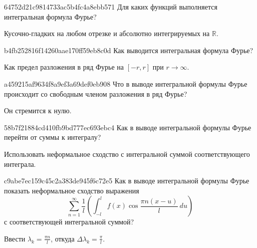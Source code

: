 \begin{note}{64752d21c9814733ac5b4fc4a8ebb571}
    Для каких функций выполняется интегральная формула Фурье?

    \begin{cloze}{1}
        Кусочно-гладких на любом отрезке и абсолютно интегрируемых на \({ \mathbb R }\).
    \end{cloze}
\end{note}

\begin{note}{b4fb252816f14260aae170ff59eb8c0d}
    Как выводится интегральная формула Фурье?

    \begin{cloze}{1}
        Как предел разложения в ряд Фурье на \({ [-r, r] }\) при \({ r \to \infty }\).
    \end{cloze}
\end{note}

\begin{note}{a459215af9634f8a9ef3a69def0eb908}
    Что в выводе интегральной формулы Фурье происходит со свободным членом разложения в ряд Фурье?

    \begin{cloze}{1}
        Он стремится к нулю.
    \end{cloze}
\end{note}

\begin{note}{58b7f21884cd410fb9bd777ec693ebc4}
    Как в выводе интегральной формулы Фурье перейти от суммы к интегралу?

    \begin{cloze}{1}
        Использовать неформальное сходство с интегральной суммой соответствующего интеграла.
    \end{cloze}
\end{note}

\begin{note}{c9abe7ec159c45c2a383de945f6c72e5}
    Как в выводе интегральной формулы Фурье показать неформальное сходство выражения
    \[
        \sum_{n=1}^{\infty} \frac{1}{l} \left( \int_{-l}^{l} f(x) \cos \frac{\pi n (x - u)}{l}\: du \right)
    \]
    с соответствующей интегральной суммой?

    \begin{cloze}{1}
        Ввести \({ \lambda_k = \frac{\pi n}{l} }\), откуда \({ \Delta \lambda_k = \frac{\pi}{l} }\).
    \end{cloze}
\end{note}

